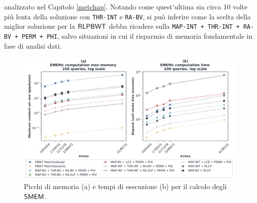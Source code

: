 analizzato nel Capitolo \ref{metchap}. Notando come quest'ultima sia circa 10
volte più lenta della soluzione con \texttt{THR-INT} e \texttt{RA-BV}, si può
inferire come la scelta della miglior soluzione per la 
$\mbox{\rm {\sf RLPBWT}}$ debba ricadere sulla \texttt{MAP-INT + THR-INT + RA-BV + PERM +
  PHI}, salvo situazioni in cui il risparmio di memoria
fondamentale in fase di analisi dati. 
\begin{figure}
  \centering
  \includegraphics[width=\linewidth]{img/exe_time_mem_paper}
  \caption{Picchi di memoria (a) e tempi di esecuzione (b) per il calcolo degli
    $\mbox{\rm {\sf SMEM}}$.}
  \label{fig:smemtimememchr}
\end{figure}
